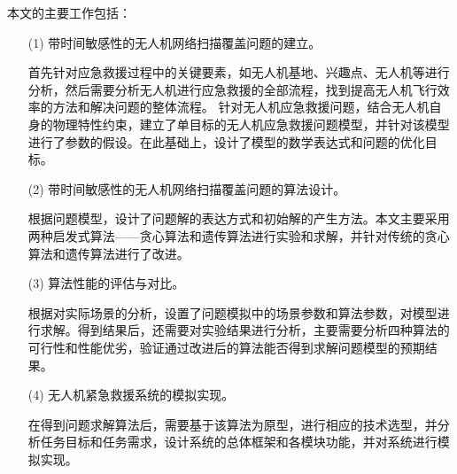 本文的主要工作包括：
\begin{itemize}
  \item [(1)] 
  带时间敏感性的无人机网络扫描覆盖问题的建立。


  首先针对应急救援过程中的关键要素，如无人机基地、兴趣点、无人机等进行分析，然后需要分析无人机进行应急救援的全部流程，找到提高无人机飞行效率的方法和解决问题的整体流程。
  针对无人机应急救援问题，结合无人机自身的物理特性约束，建立了单目标的无人机应急救援问题模型，并针对该模型进行了参数的假设。在此基础上，设计了模型的数学表达式和问题的优化目标。
  \item [(2)]
  带时间敏感性的无人机网络扫描覆盖问题的算法设计。


  根据问题模型，设计了问题解的表达方式和初始解的产生方法。本文主要采用两种启发式算法——贪心算法和遗传算法进行实验和求解，并针对传统的贪心算法和遗传算法进行了改进。
  \item [(3)]
  算法性能的评估与对比。


  根据对实际场景的分析，设置了问题模拟中的场景参数和算法参数，对模型进行求解。得到结果后，还需要对实验结果进行分析，主要需要分析四种算法的可行性和性能优劣，验证通过改进后的算法能否得到求解问题模型的预期结果。
  \item [(4)]
  无人机紧急救援系统的模拟实现。


  在得到问题求解算法后，需要基于该算法为原型，进行相应的技术选型，并分析任务目标和任务需求，设计系统的总体框架和各模块功能，并对系统进行模拟实现。
\end{itemize}